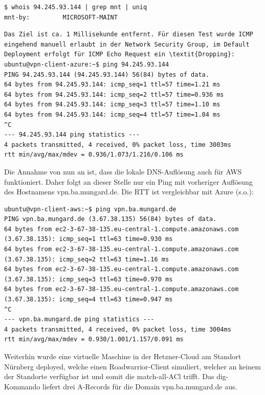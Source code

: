 \begin{lstlisting}[label=whois-microsoft-ip,caption=.]
$ whois 94.245.93.144 | grep mnt | uniq
mnt-by:         MICROSOFT-MAINT
\end{lstlisting}

\begin{lstlisting}[label=ping-microsoft-ip,caption=.]
Das Ziel ist ca. 1 Millisekunde entfernt. Für diesen Test wurde ICMP eingehend manuell erlaubt in der Network Security Group, im Default Deployment erfolgt für ICMP Echo Request ein \textit{Dropping}:
ubuntu@vpn-client-azure:~$ ping 94.245.93.144
PING 94.245.93.144 (94.245.93.144) 56(84) bytes of data.
64 bytes from 94.245.93.144: icmp_seq=1 ttl=57 time=1.21 ms
64 bytes from 94.245.93.144: icmp_seq=2 ttl=57 time=0.936 ms
64 bytes from 94.245.93.144: icmp_seq=3 ttl=57 time=1.10 ms
64 bytes from 94.245.93.144: icmp_seq=4 ttl=57 time=1.04 ms
^C
--- 94.245.93.144 ping statistics ---
4 packets transmitted, 4 received, 0% packet loss, time 3003ms
rtt min/avg/max/mdev = 0.936/1.073/1.216/0.106 ms
\end{lstlisting}

Die Annahme von nun an ist, dass die lokale DNS-Auflösung auch für AWS funktioniert. Daher folgt an dieser Stelle nur ein Ping mit vorheriger Auflösung des Hostnamens vpn.ba.mungard.de. Die RTT ist vergleichbar mit Azure (s.o.):

\begin{lstlisting}[label=ping-aws-ip,caption=.]
ubuntu@vpn-client-aws:~$ ping vpn.ba.mungard.de
PING vpn.ba.mungard.de (3.67.38.135) 56(84) bytes of data.
64 bytes from ec2-3-67-38-135.eu-central-1.compute.amazonaws.com (3.67.38.135): icmp_seq=1 ttl=63 time=0.930 ms
64 bytes from ec2-3-67-38-135.eu-central-1.compute.amazonaws.com (3.67.38.135): icmp_seq=2 ttl=63 time=1.16 ms
64 bytes from ec2-3-67-38-135.eu-central-1.compute.amazonaws.com (3.67.38.135): icmp_seq=3 ttl=63 time=0.970 ms
64 bytes from ec2-3-67-38-135.eu-central-1.compute.amazonaws.com (3.67.38.135): icmp_seq=4 ttl=63 time=0.947 ms
^C
--- vpn.ba.mungard.de ping statistics ---
4 packets transmitted, 4 received, 0% packet loss, time 3004ms
rtt min/avg/max/mdev = 0.930/1.001/1.157/0.091 ms
\end{lstlisting}

Weiterhin wurde eine virtuelle Maschine in der Hetzner-Cloud am Standort Nürnberg deployed, welche einen Roadwarrior-Client simuliert, welcher an keinem der Standorte verfügbar ist und somit die \glqq match-all\grqq-ACl trifft. Das dig-Kommando liefert drei A-Records für die Domain vpn.ba.mungard.de aus.

